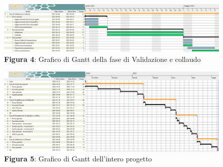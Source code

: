 \begin{landscape}
	\begin{figure}[H]
		\centering
		\includegraphics[width=\linewidth]{res/images/ganttFase4.png}
		\caption*{\textbf{Figura 4}{: Grafico di Gantt della fase di Validazione e collaudo}}
		\label{fig:Gantt Analisi dei requisiti}
	\end{figure}
\end{landscape}


\begin{landscape}
	\begin{figure}[H]
		\centering
		\includegraphics[width=\linewidth]{res/images/ganttTotale.png}
		\caption*{\textbf{Figura 5}: Grafico di Gantt dell'intero progetto}
		\label{fig:Gantt Analisi dei requisiti}
	\end{figure}
\end{landscape}

